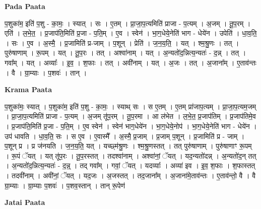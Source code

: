 \documentclass[17pt]{extarticle}
\begin{document}
\textbf{Pada Paata} \newline

प॒शुका॑म॒ इति॑ प॒शु - का॒मः॒ । स्यात् । सः । ए॒तम् । प्रा॒जा॒प॒त्यमिति॑ प्राजा - प॒त्यम् । अ॒जम् । तू॒प॒रम् । एति॑ । ल॒भे॒त॒ । प्र॒जाप॑ति॒मिति॑ प्र॒जा - प॒ति॒म् । ए॒व । स्वेन॑ । भा॒ग॒धेये॒नेति॑ भाग - धेये॑न । उपेति॑ । धा॒व॒ति॒ । सः । ए॒व । अ॒स्मै॒ । प्र॒जामिति॑ प्र-जाम् । प॒शून् । प्रेति॑ । ज॒न॒य॒ति॒ । यत् । श्म॒श्रु॒णः । तत् । पुरु॑षाणाम् । रू॒पम् । यत् । तू॒प॒रः । तत् । अश्वा॑नाम् । यत् । अ॒न्यतो॑द॒न्नित्य॒न्यतः॑ - द॒न्न् । तत् । गवा᳚म् । यत् । अव्याः᳚ । इ॒व॒ । श॒फाः । तत् । अवी॑नाम् । यत् । अ॒जः । तत् । अ॒जाना᳚म् । ए॒ताव॑न्तः । वै । ग्रा॒म्याः । प॒शवः॑ । तान् ।  \newline


\textbf{Krama Paata} \newline

प॒शुका॑मः॒ स्यात् । प॒शुका॑म॒ इति॑ प॒शु - का॒मः॒ । स्याथ् सः । स ए॒तम् । ए॒तम् प्रा॑जाप॒त्यम् । प्रा॒जा॒प॒त्यम॒जम् । प्रा॒जा॒प॒त्यमिति॑ प्राजा - प॒त्यम् । अ॒जम् तू॑प॒रम् । तू॒प॒रमा । आ ल॑भेत । ल॒भे॒त॒ प्र॒जाप॑तिम् । प्र॒जाप॑तिमे॒व । प्र॒जाप॑ति॒मिति॑ प्र॒जा - प॒ति॒म् । ए॒व स्वेन॑ । स्वेन॑ भाग॒धेये॑न । भा॒ग॒धेये॒नोप॑ । भा॒ग॒धेये॒नेति॑ भाग - धेये॑न । उप॑ धावति । धा॒व॒ति॒ सः । स ए॒व । ए॒वास्मै᳚ । अ॒स्मै॒ प्र॒जाम् । प्र॒जाम् प॒शून् । प्र॒जामिति॑ प्र - जाम् । प॒शून् प्र । प्र ज॑नयति । ज॒न॒य॒ति॒ यत् । यच्छ्म॑श्रु॒णः । श्म॒श्रु॒णस्तत् । तत् पुरु॑षाणाम् । पुरु॑षाणाꣳ रू॒पम् । रू॒पं ॅयत् । यत् तू॑प॒रः । तू॒प॒रस्तत् । तदश्वा॑नाम् । अश्वा॑नां॒ ॅयत् । यद॒न्यतो॑दन्न् । अ॒न्यतो॑द॒न् तत् । अ॒न्यतो॑द॒न्नित्य॒न्यतः॑ - द॒न्न्॒ । तद् गवा᳚म् । गवां॒ ॅयत् । यदव्याः᳚ । अव्या॑ इव । इ॒व॒ श॒फाः । श॒फास्तत् । तदवी॑नाम् । अवी॑नां॒ ॅयत् । यद॒जः । अ॒जस्तत् । तद॒जाना᳚म् । अ॒जाना॑मे॒ताव॑न्तः । ए॒ताव॑न्तो॒ वै । वै ग्रा॒म्याः । ग्रा॒म्याः प॒शवः॑ । प॒शव॒स्तान् । तान् रू॒पेण॑ \newline

\textbf{Jatai Paata} \newline
\end{document}

